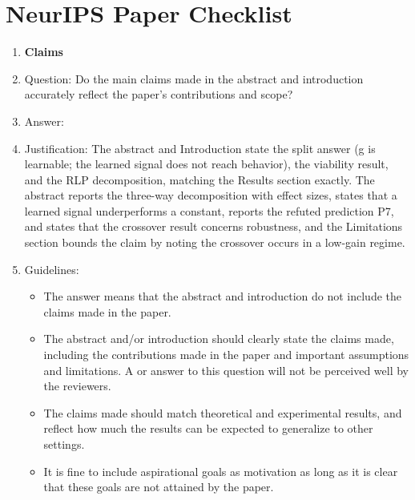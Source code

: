 \section*{NeurIPS Paper Checklist}

\begin{enumerate}

\item {\bf Claims}
    \item[] Question: Do the main claims made in the abstract and introduction accurately reflect the paper's contributions and scope?
    \item[] Answer: \answerYes{}
    \item[] Justification: The abstract and Introduction state the split answer (g is learnable; the learned signal does not reach behavior), the viability result, and the RLP decomposition, matching the Results section exactly. The abstract reports the three-way decomposition with effect sizes, states that a learned signal underperforms a constant, reports the refuted prediction P7, and states that the crossover result concerns robustness, and the Limitations section bounds the claim by noting the crossover occurs in a low-gain regime.
    \item[] Guidelines:
    \begin{itemize}
        \item The answer \answerNA{} means that the abstract and introduction do not include the claims made in the paper.
        \item The abstract and/or introduction should clearly state the claims made, including the contributions made in the paper and important assumptions and limitations. A \answerNo{} or \answerNA{} answer to this question will not be perceived well by the reviewers. 
        \item The claims made should match theoretical and experimental results, and reflect how much the results can be expected to generalize to other settings. 
        \item It is fine to include aspirational goals as motivation as long as it is clear that these goals are not attained by the paper. 
    \end{itemize}


\end{enumerate}
